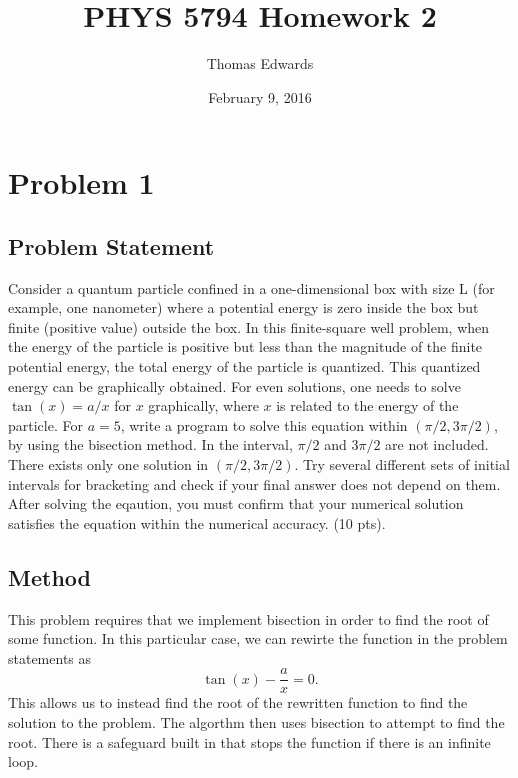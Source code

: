 \documentclass[10pt,letter]{article}
\begin{document}
\begin{titlepage}
\title{PHYS 5794 Homework 2}
\date{February 9, 2016}
\author{Thomas Edwards}
\maketitle
\end{titlepage}

\section{Problem 1}


\subsection{Problem Statement}
Consider a quantum particle confined in a one-dimensional box with size L (for example, one nanometer)
where a potential energy is zero inside the box but finite (positive value) outside the box. In this
finite-square well problem, when the energy of the particle is positive but less than the magnitude of
the finite potential energy, the total energy of the particle is quantized. This quantized energy can
be graphically obtained. For even solutions, one needs to solve $\tan(x) = a/x$ for $x$ graphically, where
$x$ is related to the energy of the particle. For $a = 5$, write a program to solve this equation within
$(\pi/2, 3\pi/2)$, by using the bisection method. In the interval, $\pi/2$ and $3\pi/2$ are not included. There
exists only one solution in $(\pi/2, 3\pi/2)$. Try several different sets of initial intervals for bracketing and
check if your final answer does not depend on them. After solving the eqaution, you must confirm
that your numerical solution satisfies the equation within the numerical accuracy. (10 pts).

\subsection{Method}

This problem requires that we implement bisection in order to find the root of some function. In this particular case, we can rewirte the function in the problem statements as 
$$ \tan(x) - \frac{a}{x} = 0 .$$
This allows us to instead find the root of the rewritten function to find the solution to the problem.
The algorthm then uses bisection to attempt to find the root. There is a safeguard built in that stops the function if there is an infinite loop.
\end{document}
